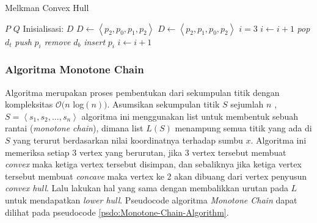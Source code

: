 \begin{algorithm}
	\caption{Melkman Convex Hull}
	\label{psdo:Melkman-Convex-Hull}
	\begin{algorithmic}[1]
		\Require $P$
		\Ensure $Q$
        \State Inisialisasi: $D$
            \State$D \leftarrow \left \langle p_2, p_0, p_1, p_2 \right \rangle$
        \Else
            \State $D \leftarrow \left \langle p_2, p_1, p_0, p_2 \right \rangle$
        \EndIf
        \State $i=3$
                \State $i \leftarrow i+1$
            \EndWhile
                \State \textit{pop} $d_t$
            \EndWhile
            \State \textit{push} $p_i$
                \State \textit{remove} $d_b$
            \EndWhile
            \State \textit{insert} $p_i$
            \State $i \leftarrow i+1$
        \EndWhile
	\end{algorithmic}
\end{algorithm}

\subsubsection{Algoritma Monotone Chain}
\label{sec:algoritma-monotone-chain}
Algoritma \MC merupakan proses pembentukan \CH dari sekumpulan titik dengan kompleksitas $\mathcal{O}(n$ log$(n))$\cite{monotone_chain_algorithm}. Asumsikan sekumpulan titik $S$ sejumlah $n$ ,$S = \left \langle s_1, s_2, ..., s_n\right \rangle$ algoritma ini menggunakan list untuk membentuk sebuah rantai (\textit{monotone chain}), dimana list $L(S)$ menampung semua titik yang ada di $S$ yang terurut berdasarkan nilai koordinatnya terhadap sumbu $x$. Algoritma ini memeriksa setiap 3 vertex yang berurutan, jika 3 vertex tersebut membuat \textit{convex} maka ketiga vertex tersebut disimpan, dan sebaliknya jika ketiga vertex tersebut membuat \textit{concave} maka vertex ke 2 akan dibuang dari vertex penyusun \textit{convex hull}. Lalu lakukan hal yang sama dengan membalikkan urutan pada $L$ untuk mendapatkan \textit{lower hull}. Pseudocode algoritma \textit{Monotone Chain} dapat dilihat pada pseudocode \ref{psdo:Monotone-Chain-Algorithm}.

